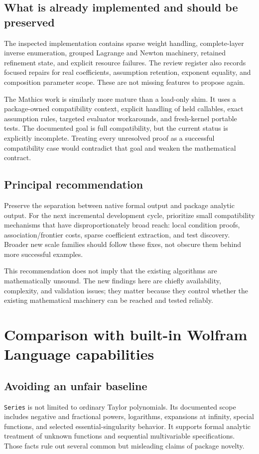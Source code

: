 \documentclass[11pt,letterpaper]{article}
\newcommand{\code}[1]{\nolinkurl{#1}}
\begin{document}
\subsection{What is already implemented and should be preserved}
The inspected implementation contains sparse weight handling, complete-layer
inverse enumeration, grouped Lagrange and Newton machinery, retained
refinement state, and explicit resource failures. The review register also
records focused repairs for real coefficients, assumption retention,
exponent equality, and composition parameter scope. These are not missing
features to propose again.
\cite{repo-incremental,repo-refinement,review-status}

The Mathics work is similarly more mature than a load-only shim. It uses a
package-owned compatibility context, explicit handling of held callables,
exact assumption rules, targeted evaluator workarounds, and fresh-kernel
portable tests. The documented goal is full compatibility, but the current
status is explicitly incomplete. Treating every unresolved proof as a
successful compatibility case would contradict that goal and weaken the
mathematical contract.
\cite{repo-mathics,repo-massumptions,repo-mcalls,repo-mbranches}

\subsection{Principal recommendation}
Preserve the separation between native formal output and package analytic
output. For the next incremental development cycle, prioritize small
compatibility mechanisms that have disproportionately broad reach: local
condition proofs, association/frontier costs, sparse coefficient extraction,
and test discovery. Broader new scale families should follow these fixes,
not obscure them behind more successful examples.

This recommendation does not imply that the existing algorithms are
mathematically unsound. The new findings here are chiefly availability,
complexity, and validation issues; they matter because they control whether
the existing mathematical machinery can be reached and tested reliably.

\section{Comparison with built-in Wolfram Language capabilities}
\label{sec:native}

\subsection{Avoiding an unfair baseline}
\code{Series} is not limited to ordinary Taylor polynomials. Its documented
scope includes negative and fractional powers, logarithms, expansions at
infinity, special functions, and selected essential-singularity behavior.
It supports formal analytic treatment of unknown functions and sequential
multivariable specifications. Those facts rule out several common but
misleading claims of package novelty. \cite{wl-series}
\end{document}
